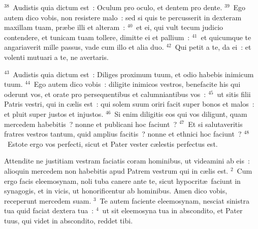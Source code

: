 ${}^{38}$~Audistis quia dictum est~: Oculum pro oculo, et dentem pro dente.
${}^{39}$~Ego autem dico vobis, non resistere malo~: sed si quis te percusserit in dexteram maxillam tuam, pr\ae be illi et alteram~:
${}^{40}$~et ei, qui vult tecum judicio contendere, et tunicam tuam tollere, dimitte ei et pallium~:
${}^{41}$~et quicumque te angariaverit mille passus, vade cum illo et alia duo.
${}^{42}$~Qui petit a te, da ei~: et volenti mutuari a te, ne avertaris.


${}^{43}$~Audistis quia dictum est~: Diliges proximum tuum, et odio habebis inimicum tuum.
${}^{44}$~Ego autem dico vobis~: diligite inimicos vestros, benefacite his qui oderunt vos, et orate pro persequentibus et calumniantibus vos~:
${}^{45}$~ut sitis filii Patris vestri, qui in c\ae lis est~: qui solem suum oriri facit super bonos et malos~: et pluit super justos et injustos.
${}^{46}$~Si enim diligitis eos qui vos diligunt, quam mercedem habebitis~? nonne et publicani hoc faciunt~?
${}^{47}$~Et si salutaveritis fratres vestros tantum, quid amplius facitis~? nonne et ethnici hoc faciunt~?
${}^{48}$~Estote ergo vos perfecti, sicut et Pater vester c\ae lestis perfectus est.

\lettrine[lines=10,image=true,loversize=0.05,lraise=-0.03]{A}{}ttendite ne justitiam vestram faciatis coram hominibus, ut videamini ab eis~: alioquin mercedem non habebitis apud Patrem vestrum qui in c\ae lis est.
${}^{2}$~Cum ergo facis eleemosynam, noli tuba canere ante te, sicut hypocrit\ae\ faciunt in synagogis, et in vicis, ut honorificentur ab hominibus. Amen dico vobis, receperunt mercedem suam.
${}^{3}$~Te autem faciente eleemosynam, nesciat sinistra tua quid faciat dextera tua~:
${}^{4}$~ut sit eleemosyna tua in abscondito, et Pater tuus, qui videt in abscondito, reddet tibi.


